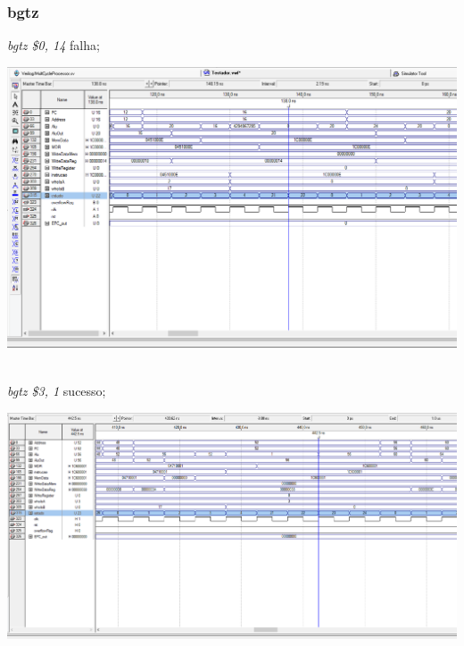 \documentclass{article}
\begin{document}
    \subsubsection{bgtz}
    {\it bgtz \$0, 14} falha;\\
    \begin{center}
        \includegraphics[scale=0.25]{bgtzfalha.PNG}
    \end{center}
    \\
    {\it bgtz \$3, 1} sucesso;\\
    \begin{center}
        \includegraphics[scale=0.25]{bgtzsucesso.PNG}
    \end{center}
    
    \\
    \newpage
\end{document}
